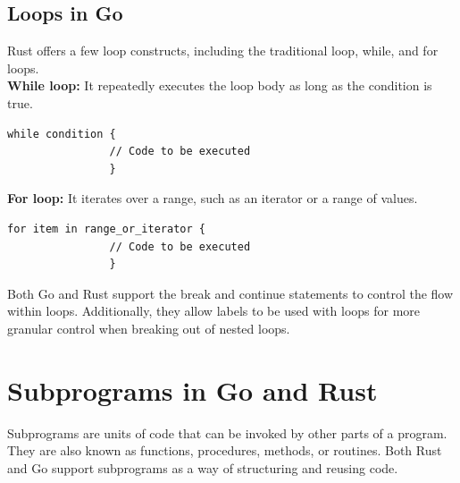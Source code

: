 \documentclass{dclass}
\begin{document}
\subsection{Loops in Go}
Rust offers a few loop constructs, including the traditional loop, while, and for loops.\\
\textbf{While loop:} It repeatedly executes the loop body as long as the condition is true.\\
\begin{lstlisting}[frame=single]
                while condition {
                // Code to be executed
                }
\end{lstlisting}
\textbf{For loop:} It iterates over a range, such as an iterator or a range of values.\\
\begin{lstlisting}[frame=single]
                for item in range_or_iterator {
                // Code to be executed
                }
\end{lstlisting}
Both Go and Rust support the break and continue statements to control the flow within loops. Additionally, they allow labels to be used with loops for more granular control when breaking out of nested loops.

\section{Subprograms in Go and Rust}

Subprograms are units of code that can be invoked by other parts of a program. They are also known as functions, procedures, methods, or routines. Both Rust and Go support subprograms as a way of structuring and reusing code.\\
\end{document}
